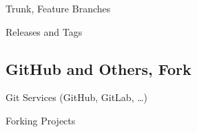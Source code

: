 \documentclass[xetex, handout]{beamer}
\begin{document}
\begin{frame}{Trunk, Feature Branches}
\end{frame}

\begin{frame}{Releases and Tags}
\end{frame}

\subsection{GitHub and Others, Fork}

\begin{frame}{Git Services (GitHub, GitLab, \ldots)}
\end{frame}

\begin{frame}{Forking Projects}
\end{frame}
\end{document}
